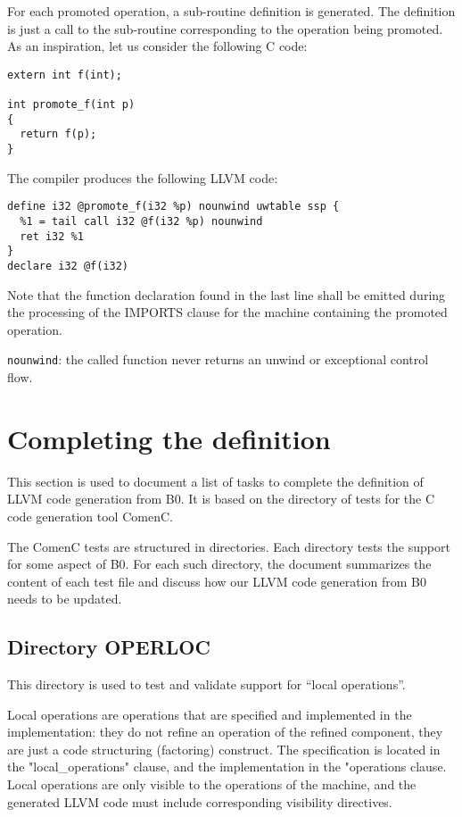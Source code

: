 \documentclass{article}
\begin{document}
For each promoted operation, a sub-routine definition is generated.
The definition is just a call to the sub-routine corresponding to
the operation being promoted. As an inspiration, let us consider
the following C code:
\begin{verbatim}
extern int f(int);

int promote_f(int p)
{
  return f(p);
}
\end{verbatim}
The compiler produces the following LLVM code:
\begin{verbatim}
define i32 @promote_f(i32 %p) nounwind uwtable ssp {
  %1 = tail call i32 @f(i32 %p) nounwind
  ret i32 %1
}
declare i32 @f(i32)
\end{verbatim}
Note that the function declaration found in the last line shall be
emitted during the processing of the IMPORTS clause for the machine
containing the promoted operation.

\texttt{nounwind}: the called function never returns an unwind or exceptional
control flow.

\section{Completing the definition}

This section is used to document a list of tasks to complete the
definition of LLVM code generation from B0. It is based on the
directory of tests for the C code generation tool ComenC.

The ComenC tests are structured in directories. Each directory tests
the support for some aspect of B0. For each such directory, the
document summarizes the content of each test file and discuss how our
LLVM code generation from B0 needs to be updated.

\subsection{Directory OPERLOC}

This directory is used to test and validate support for ``local operations''.

Local operations are operations that are specified and implemented in
the implementation: they do not refine an operation of the refined
component, they are just a code structuring (factoring) construct. The
specification is located in the "local\_operations" clause, and the
implementation in the "operations clause. Local operations are only
visible to the operations of the machine, and the generated LLVM code
must include corresponding visibility directives.
\end{document}
